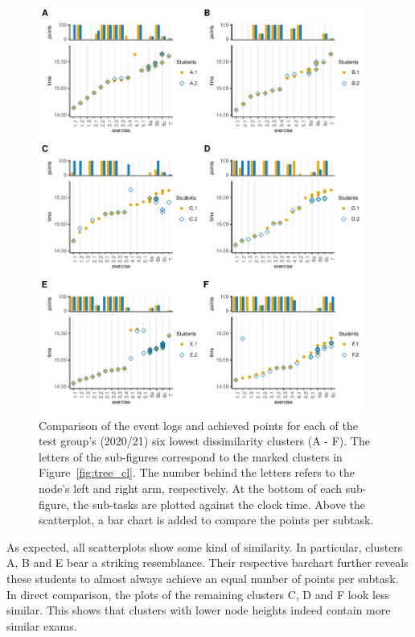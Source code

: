 \documentclass{edm_article}
\begin{document}
\begin{figure}
\begin{center}
\includegraphics[width = 0.95\textwidth]{cowplot_comp_6.pdf}
\caption{Comparison of the event logs and achieved points for each of the test group's (2020/21) six lowest dissimilarity clusters (A - F).  The letters of the sub-figures correspond to the marked clusters in Figure~\ref{fig:tree_cl}. The number behind the letters refers to the node's left and right arm, respectively. At the bottom of each sub-figure, the sub-tasks are plotted against the clock time. Above the scatterplot, a bar chart is added to compare the points per subtask.}
\label{fig:comp_stud_20_21}
\end{center}
\end{figure}

As expected, all scatterplots show some kind of similarity. In particular, clusters A, B and E bear a striking resemblance. Their respective barchart further reveals these students to almost always achieve an equal number of points per subtask. In direct comparison, the plots of the remaining clusters C, D and F look less similar. This shows that clusters with lower node heights indeed contain more similar exams.
\end{document}
